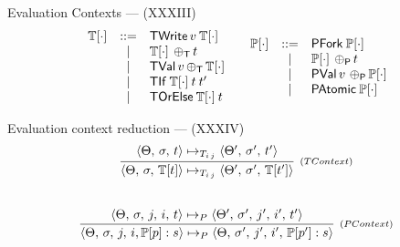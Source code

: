 \documentclass[14pt]{beamer}
\newcommand{\EvalCtxTran}[1]{\ensuremath{\mathbb{T}[#1]}}
\newcommand{\EvalCtxProc}[1]{\ensuremath{\mathbb{P}[#1]}}
\newcommand{\C}[1]{\red{\mathsf{#1}}}
\begin{document}
     \begin{frame}{Evaluation Contexts --- (XXXIII)}
        \[
          \begin{array}{cc}
          \begin{array}{rcl}
                      \EvalCtxTran{\cdot} & ::=    & \ensuremath{\C{TWrite}}\, v\:\EvalCtxTran{\cdot}\\
                                                   & \mid &\EvalCtxTran{\cdot}\: \ensuremath{\C{\,\oplus_T\,}} t\\
                                                   & \mid & \ensuremath{\C{TVal}}\,v \ensuremath{\C{\,\oplus_T\,}} \EvalCtxTran{\cdot}\\
                                                   & \mid & \ensuremath{\C{TIf}}\:\EvalCtxTran{\cdot}\:t\:t' \\
                                                   & \mid & \ensuremath{\C{TOrElse}}\:\EvalCtxTran{\cdot}\:t\\

          \end{array} &
          \begin{array}{rcl}
                      \EvalCtxProc{\cdot} & ::=    & \ensuremath{\C{PFork}}\:\EvalCtxProc{\cdot}\\
                                                   & \mid &\EvalCtxProc{\cdot}\:\ensuremath{\C{\,\oplus_P\,}} t\\
                                                   & \mid & \ensuremath{\C{PVal}}\,v\,\ensuremath{\C{\,\oplus_P\,}}\EvalCtxProc{\cdot}\\
                                                   & \mid & \ensuremath{\C{PAtomic}}\:\EvalCtxProc{\cdot}

          \end{array}
          \end{array}
        \]
     \end{frame}
     \begin{frame}{Evaluation context reduction --- (XXXIV)}
\[
\begin{array}{c}
  \infer[_{(TContext)}]
        { \langle \Theta,\,\sigma,\,\EvalCtxTran{t}\rangle \mapsto_{T_{i\,j}}
          \langle \Theta',\,\sigma',\,\EvalCtxTran{t'}\rangle }
        { \langle \Theta,\,\sigma,\,t \rangle \mapsto_{T_{i\,j}}
          \langle \Theta',\,\sigma',\, t'\rangle } \\ \\ \\
  \infer[_{(PContext)}]
        { \langle \Theta,\,\sigma,\,j,\,i,\EvalCtxProc{p} : s\rangle \mapsto_{P}
          \langle \Theta,\,\sigma',\,j',\,i',\,\EvalCtxProc{p'} : s\rangle }
        { \langle \Theta,\,\sigma,\,j,\,i,\,t \rangle \mapsto_{P}
          \langle \Theta',\,\sigma',\,j',\,i',\, t'\rangle }
\end{array}
\]        
     \end{frame}
\end{document}
